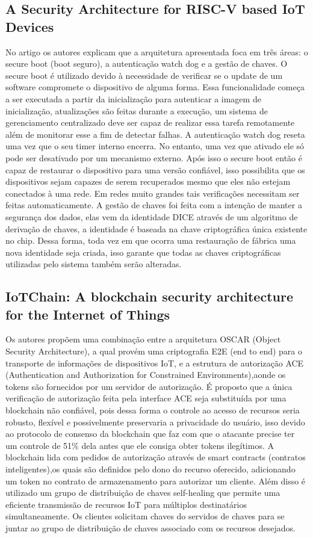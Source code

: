 \documentclass[article]{abntex2}
\begin{document}
\subsection{A Security Architecture for RISC-V based IoT Devices}%
No artigo os autores explicam que a arquitetura apresentada foca em três áreas: o secure boot (boot seguro), a autenticação watch dog e a gestão de chaves. O secure boot é utilizado devido à necessidade de verificar se o update de um software compromete o dispositivo de alguma forma. Essa funcionalidade começa a ser executada a partir da inicialização para autenticar a imagem de inicialização, atualizações são feitas durante a execução, um sistema de gerenciamento centralizado deve ser capaz de realizar essa tarefa remotamente além de monitorar esse a fim de detectar falhas. A autenticação watch dog reseta uma vez que o seu timer interno encerra. No entanto, uma vez que ativado ele só pode ser desativado por um mecanismo externo. Após isso o secure boot então é capaz de restaurar o dispositivo para uma versão confiável, isso possibilita que os dispositivos sejam capazes de serem recuperados mesmo que eles não estejam conectados à uma rede. Em redes muito grandes tais verificações necessitam ser feitas automaticamente. A gestão de chaves foi feita com a intenção de manter a segurança dos dados, elas vem da identidade DICE através de um algoritmo de derivação de chaves, a identidade é baseada na chave criptográfica única existente no chip. Dessa forma, toda vez em que ocorra uma restauração de fábrica uma nova identidade seja criada, isso garante que todas as chaves criptográficas utilizadas pelo sistema também serão alteradas.

\subsection{IoTChain: A blockchain security architecture for the Internet of Things}%
Os autores propõem  uma combinação entre a arquitetura OSCAR (Object Security Architecture), a qual provém uma criptografia E2E (end to end) para o transporte de informações de dispositivos IoT, e a estrutura de autorização ACE (Authentication and Authorization for Constrained Environments),aonde os tokens são fornecidos por um servidor de autorização. É proposto que a única verificação de autorização feita pela interface ACE seja substituída por uma blockchain não confiável, pois dessa forma o controle ao acesso de recursos seria robusto, flexível e possivelmente preservaria a privacidade do usuário, isso devido ao protocolo de consenso da blockchain que faz com que o atacante precise ter um controle de 51\% dela antes que ele consiga obter tokens ilegítimos. A blockchain lida com pedidos de autorização através de smart contracts (contratos inteligentes),os quais são definidos pelo dono do recurso oferecido, adicionando um token no contrato de armazenamento para autorizar um cliente. Além disso é utilizado um grupo de distribuição de chaves self-healing que permite uma eficiente transmissão de recursos IoT para múltiplos destinatários simultaneamente. Os clientes solicitam chaves do servidos de chaves para se juntar ao grupo de distribuição de chaves associado com os recursos desejados.
\end{document}
